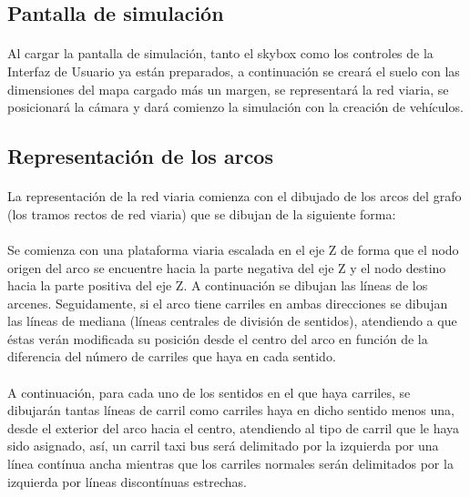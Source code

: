 	\subsection{Pantalla de simulación}
	\paragraph{}
	Al cargar la pantalla de simulación, tanto el skybox como los controles de la Interfaz de Usuario ya están preparados, a continuación se creará el suelo con las dimensiones del mapa cargado más un margen, se representará la red viaria, se posicionará la cámara y dará comienzo la simulación con la creación de vehículos.
	
	\subsection{Representación de los arcos}
	\paragraph{}
	La representación de la red viaria comienza con el dibujado de los arcos del grafo (los tramos rectos de red viaria) que se dibujan de la siguiente forma:
	
	\paragraph{}
	Se comienza con una plataforma viaria escalada en el eje Z de forma que el nodo origen del arco se encuentre hacia la parte negativa del eje Z y el nodo destino hacia la parte positiva del eje Z. A continuación se dibujan las líneas de los arcenes. Seguidamente, si el arco tiene carriles en ambas direcciones se dibujan las líneas de mediana (líneas centrales de división de sentidos), atendiendo a que éstas verán modificada su posición desde el centro del arco en función de la diferencia del número de carriles que haya en cada sentido.
	\paragraph{}
	A continuación, para cada uno de los sentidos en el que haya carriles, se dibujarán tantas líneas de carril como carriles haya en dicho sentido menos una, desde el exterior del arco hacia el centro, atendiendo al tipo de carril que le haya sido asignado, así, un carril taxi bus será delimitado por la izquierda por una línea contínua ancha mientras que los carriles normales serán delimitados por la izquierda por líneas discontínuas estrechas.
